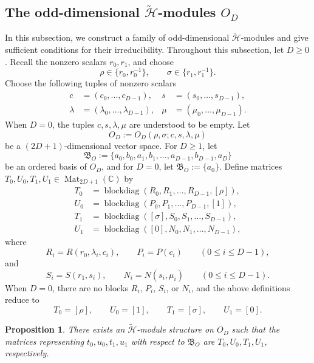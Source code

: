 \documentclass[reqno]{amsart}
\newtheorem{proposition}[theorem]{Proposition}
\theoremstyle{definition}
\begin{document}
\subsection{The odd-dimensional $\widetilde{\mathcal{H}}$-modules $O_D$}\label{subsec:O_D}



In this subsection, we construct a family of odd-dimensional
$\widetilde{\mathcal{H}}$-modules and give sufficient conditions for their
irreducibility.
Throughout this subsection, let $D\geq 0$.
Recall the nonzero scalars $r_0,r_1$, and choose
\begin{equation}
\rho \in \{r_0,r_0^{-1}\},\qquad
\sigma \in \{r_1,r_1^{-1}\}.
\label{odd rho}
\end{equation}
Choose the following tuples of nonzero scalars
\begin{align}
&& c &=(c_0,\dots,c_{D-1}), & s &=(s_0,\dots,s_{D-1}), && \label{odd cs}\\
&& \lambda &=(\lambda_0,\dots,\lambda_{D-1}), &
\mu &=(\mu_0,\dots,\mu_{D-1}). && \label{odd lambda mu}
\end{align}
When $D=0$, the tuples $c,s,\lambda,\mu$ are understood to be empty.
Let
$$
O_D:=O_D(\rho,\sigma;c,s,\lambda,\mu)
$$
be a $(2D+1)$-dimensional vector space.
For $D\geq 1$, let
$$
\mathfrak{B}_O
:=\{a_0,b_0,a_1,b_1,\dots,a_{D-1},b_{D-1},a_D\}
$$
be an ordered basis of $O_D$, and for $D=0$, let $\mathfrak{B}_O := \{a_0\}$.
Define matrices
$T_0,U_0,T_1,U_1\in\operatorname{Mat}_{2D+1}(\mathbb{C})$ by
\begin{align}
T_0&=\operatorname{blockdiag}
(R_0,R_1,\dots,R_{D-1},[\rho]),
\label{o.mat:T0}\\
U_0&=\operatorname{blockdiag}
(P_0,P_1,\dots,P_{D-1},[1]),
\label{o.mat:U0}\\
T_1&=\operatorname{blockdiag}
([\sigma],S_0,S_1,\dots,S_{D-1}),
\label{o.mat:T1}\\
U_1&=\operatorname{blockdiag}
([0],N_0,N_1,\dots,N_{D-1}),
\label{o.mat:U1}
\end{align}
where
$$
R_i=R(r_0,\lambda_i,c_i),\qquad
P_i=P(c_i)
\qquad (0\leq i\leq D-1),
$$
and
$$
S_i=S(r_1,s_i),\qquad
N_i=N(s_i,\mu_i)
\qquad (0\leq i\leq D-1).
$$
When $D=0$, there are no blocks $R_i$, $P_i$, $S_i$, or $N_i$, and the above definitions reduce to
$$
T_0=[\rho],\qquad
U_0=[1],\qquad
T_1=[\sigma],\qquad
U_1=[0].
$$


\begin{proposition}\label{prop:O_D}
%
There exists an $\widetilde{\mathcal{H}}$-module structure on $O_D$ such that
the matrices representing $t_0,u_0,t_1,u_1$ with respect to
$\mathfrak{B}_O$ are $T_0,U_0,T_1,U_1$, respectively.
%
\end{proposition}
\end{document}

